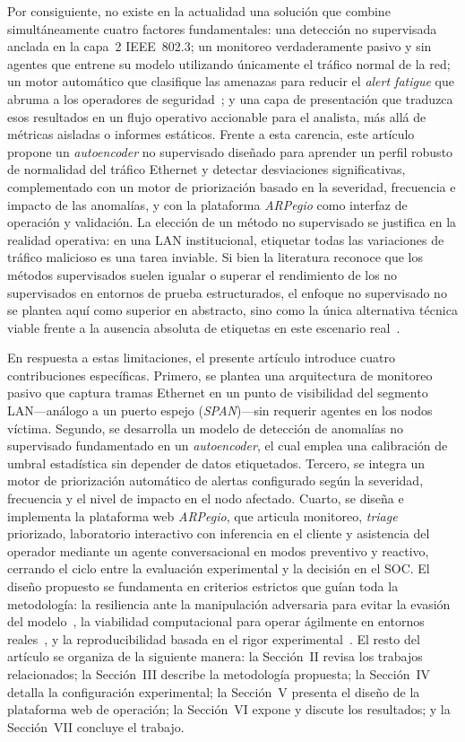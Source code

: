 \documentclass[conference]{IEEEtran}
\begin{document}
Por consiguiente, no existe en la actualidad una solución que combine
simultáneamente cuatro factores fundamentales: una detección no supervisada
anclada en la capa~2 IEEE~802.3; un monitoreo verdaderamente pasivo y
sin agentes que entrene su modelo utilizando únicamente el tráfico normal
de la red; un motor automático que clasifique las amenazas para reducir
el \textit{alert fatigue} que abruma a los operadores de
seguridad~\cite{tariq2025}; y una capa de presentación que traduzca esos
resultados en un flujo operativo accionable para el analista, más allá de
métricas aisladas o informes estáticos. Frente a esta carencia, este
artículo propone un \textit{autoencoder} no supervisado diseñado para
aprender un perfil robusto de normalidad del tráfico Ethernet y detectar
desviaciones significativas, complementado con un motor de priorización
basado en la severidad, frecuencia e impacto de las anomalías, y con la
plataforma \textit{ARPegio} como interfaz de operación y validación. La
elección de un método no supervisado se justifica en la realidad operativa: en una LAN
institucional, etiquetar todas las variaciones de tráfico malicioso es
una tarea inviable. Si bien la literatura reconoce que los métodos
supervisados suelen igualar o superar el rendimiento de los no
supervisados en entornos de prueba estructurados, el enfoque no
supervisado no se plantea aquí como superior en abstracto, sino como la
única alternativa técnica viable frente a la ausencia absoluta de
etiquetas en este escenario real~\cite{gamage2020}.

En respuesta a estas limitaciones, el presente artículo introduce cuatro
contribuciones específicas. Primero, se plantea una arquitectura de
monitoreo pasivo que captura tramas Ethernet en un punto de visibilidad
del segmento LAN---análogo a un puerto espejo (\textit{SPAN})---sin
requerir agentes en los nodos víctima. Segundo, se desarrolla un modelo de
detección de anomalías no supervisado fundamentado en un \textit{autoencoder},
el cual emplea una calibración de umbral estadística sin depender de datos
etiquetados. Tercero, se integra un motor de priorización automático de
alertas configurado según la severidad, frecuencia y el nivel de impacto
en el nodo afectado. Cuarto, se diseña e implementa la plataforma web
\textit{ARPegio}, que articula monitoreo, \textit{triage} priorizado,
laboratorio interactivo con inferencia en el cliente y asistencia del
operador mediante un agente conversacional en modos preventivo y
reactivo, cerrando el ciclo entre la evaluación experimental y la decisión
en el SOC. El diseño propuesto se fundamenta en criterios
estrictos que guían toda la metodología: la resiliencia ante la
manipulación adversaria para evitar la evasión del
modelo~\cite{he2023}, la viabilidad computacional para operar ágilmente
en entornos reales~\cite{injadat2021}, y la reproducibilidad basada en
el rigor experimental~\cite{yang2022}. El resto del artículo se organiza
de la siguiente manera: la Sección~II revisa los trabajos relacionados;
la Sección~III describe la metodología propuesta; la Sección~IV detalla
la configuración experimental; la Sección~V presenta el diseño de la
plataforma web de operación; la Sección~VI expone y discute los
resultados; y la Sección~VII concluye el trabajo.
\end{document}
